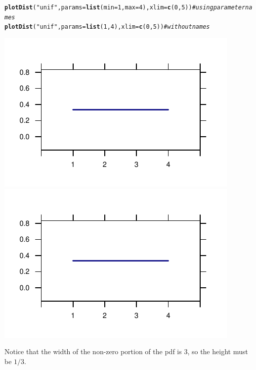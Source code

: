 \documentclass[twoside]{book}\usepackage[]{graphicx}\usepackage[]{xcolor}
\makeatletter
\def\maxwidth{ %
  \ifdim\Gin@nat@width>\linewidth
    \linewidth
  \else
    \Gin@nat@width
  \fi
}
\newcommand{\hlnum}[1]{\textcolor[rgb]{0.686,0.059,0.569}{#1}}%
\newcommand{\hlstr}[1]{\textcolor[rgb]{0.192,0.494,0.8}{#1}}%
\newcommand{\hlcom}[1]{\textcolor[rgb]{0.678,0.584,0.686}{\textit{#1}}}%
\newcommand{\hlstd}[1]{\textcolor[rgb]{0.345,0.345,0.345}{#1}}%
\newcommand{\hlkwc}[1]{\textcolor[rgb]{0.333,0.667,0.333}{#1}}%
\newcommand{\hlkwd}[1]{\textcolor[rgb]{0.737,0.353,0.396}{\textbf{#1}}}%
\newenvironment{kframe}{%
 \def\at@end@of@kframe{}%
 \ifinner\ifhmode%
  \def\at@end@of@kframe{\end{minipage}}%
  \begin{minipage}{\columnwidth}%
 \fi\fi%
 \def\FrameCommand##1{\hskip\@totalleftmargin \hskip-\fboxsep
 \colorbox{shadecolor}{##1}\hskip-\fboxsep
     \hskip-\linewidth \hskip-\@totalleftmargin \hskip\columnwidth}%
 \MakeFramed {\advance\hsize-\width
   \@totalleftmargin\z@ \linewidth\hsize
   \@setminipage}}%
 {\par\unskip\endMakeFramed%
 \at@end@of@kframe}
\newenvironment{knitrout}{}{} %
\makeatother
\begin{document}
\begin{knitrout}
\color{fgcolor}\begin{kframe}
\begin{alltt}
\hlkwd{plotDist}\hlstd{(}\hlstr{"unif"}\hlstd{,} \hlkwc{params} \hlstd{=} \hlkwd{list}\hlstd{(}\hlkwc{min} \hlstd{=} \hlnum{1}\hlstd{,} \hlkwc{max} \hlstd{=} \hlnum{4}\hlstd{),} \hlkwc{xlim} \hlstd{=} \hlkwd{c}\hlstd{(}\hlnum{0}\hlstd{,} \hlnum{5}\hlstd{))}  \hlcom{# using parameter names}
\hlkwd{plotDist}\hlstd{(}\hlstr{"unif"}\hlstd{,} \hlkwc{params} \hlstd{=} \hlkwd{list}\hlstd{(}\hlnum{1}\hlstd{,} \hlnum{4}\hlstd{),} \hlkwc{xlim} \hlstd{=} \hlkwd{c}\hlstd{(}\hlnum{0}\hlstd{,} \hlnum{5}\hlstd{))}  \hlcom{# without names}
\end{alltt}
\end{kframe}

{\centering \includegraphics[width=\maxwidth]{figures/fig-unnamed-chunk-78-1} 
\includegraphics[width=\maxwidth]{figures/fig-unnamed-chunk-78-2} 

}



\end{knitrout}
Notice that the width of the non-zero portion of the pdf is 3, so the height must be $1/3$.
\end{document}
